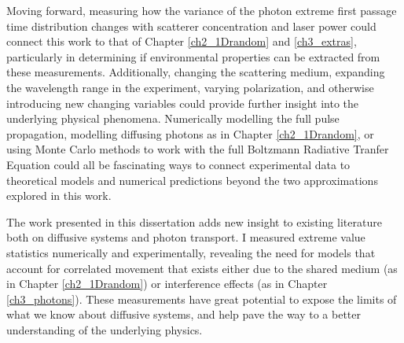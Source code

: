 Moving forward, measuring how the variance of the photon extreme first passage time distribution changes with scatterer concentration and laser power could connect this work to that of Chapter \ref{ch2_1Drandom} and \ref{ch3_extras}, particularly in determining if environmental properties can be extracted from these measurements. Additionally, changing the scattering medium, expanding the wavelength range in the experiment, varying polarization, and otherwise introducing new changing variables could provide further insight into the underlying physical phenomena. Numerically modelling the full pulse propagation, modelling diffusing photons as in Chapter \ref{ch2_1Drandom}, or using Monte Carlo methods to work with the full Boltzmann Radiative Tranfer Equation could all be fascinating ways to connect experimental data to theoretical models and numerical predictions beyond the two approximations explored in this work.

The work presented in this dissertation adds new insight to existing literature both on diffusive systems and photon transport. I measured extreme value statistics numerically and experimentally, revealing the need for models that account for correlated movement that exists either due to the shared medium (as in Chapter \ref{ch2_1Drandom}) or interference effects (as in Chapter \ref{ch3_photons}). These measurements have great potential to expose the limits of what we know about diffusive systems, and help pave the way to a better understanding of the underlying physics.